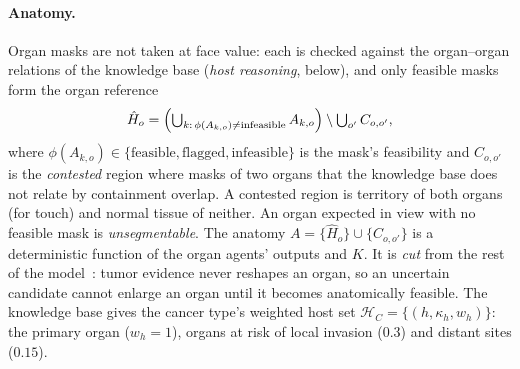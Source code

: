 \documentclass[fleqn,10pt]{olplainarticle}
\begin{document}
\paragraph{Anatomy.}
Organ masks are not taken at face value: each is checked against the organ--organ relations of the knowledge base
(\emph{host reasoning}, below), and only feasible masks form the organ reference
\begin{equation}
\label{eq:organ_reference}
\hat H_o=\Bigl(\textstyle\bigcup_{k:\,\phi(A_{k,o})\neq\mathrm{infeasible}}A_{k,o}\Bigr)\setminus\textstyle\bigcup_{o'}C_{o,o'},
\end{equation}
where $\phi(A_{k,o})\in\{\text{feasible},\text{flagged},\text{infeasible}\}$ is the mask's feasibility and $C_{o,o'}$ is the
\emph{contested} region where masks of two organs that the knowledge base does not relate by containment overlap. A
contested region is territory of both organs (for touch) and normal tissue of neither. An organ expected in view with no
feasible mask is \emph{unsegmentable}. The anatomy $A=\{\hat H_o\}\cup\{C_{o,o'}\}$ is a deterministic function of the organ
agents' outputs and $K$. It is \emph{cut} from the rest of the model~\cite{liu2009modularization,plummer2015cuts,jacob2017better}:
tumor evidence never reshapes an organ, so an uncertain candidate cannot enlarge an organ until it becomes anatomically
feasible. The knowledge base gives the cancer type's weighted host set
$\mathcal{H}_C=\{(h,\kappa_h,w_h)\}$: the primary organ ($w_h=1$), organs at risk of local invasion ($0.3$) and distant
sites ($0.15$).
\end{document}
